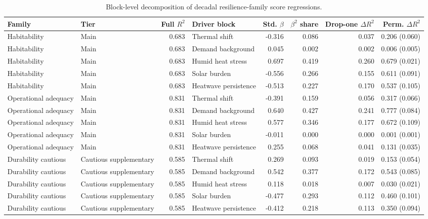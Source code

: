 \begin{table}[t]
\centering
\scriptsize
\caption{Block-level decomposition of decadal resilience-family score regressions.}
\label{tab:family-regression-decomposition}
\begin{threeparttable}
\begin{tabular}{llrlrrrr}
\toprule
Family & Tier & Full $R^2$ & Driver block & Std. $\beta$ & $\beta^2$ share & Drop-one $\Delta R^2$ & Perm. $\Delta R^2$ \\
\midrule
Habitability & Main & 0.683 & Thermal shift & -0.316 & 0.086 & 0.037 & 0.206 (0.060) \\
Habitability & Main & 0.683 & Demand background & 0.045 & 0.002 & 0.002 & 0.006 (0.005) \\
Habitability & Main & 0.683 & Humid heat stress & 0.697 & 0.419 & 0.260 & 0.679 (0.021) \\
Habitability & Main & 0.683 & Solar burden & -0.556 & 0.266 & 0.155 & 0.611 (0.091) \\
Habitability & Main & 0.683 & Heatwave persistence & -0.513 & 0.227 & 0.170 & 0.537 (0.105) \\
\addlinespace
Operational adequacy & Main & 0.831 & Thermal shift & -0.391 & 0.159 & 0.056 & 0.317 (0.066) \\
Operational adequacy & Main & 0.831 & Demand background & 0.640 & 0.427 & 0.241 & 0.777 (0.084) \\
Operational adequacy & Main & 0.831 & Humid heat stress & 0.577 & 0.346 & 0.177 & 0.672 (0.109) \\
Operational adequacy & Main & 0.831 & Solar burden & -0.011 & 0.000 & 0.000 & 0.001 (0.001) \\
Operational adequacy & Main & 0.831 & Heatwave persistence & 0.255 & 0.068 & 0.041 & 0.131 (0.035) \\
\addlinespace
Durability cautious & Cautious supplementary & 0.585 & Thermal shift & 0.269 & 0.093 & 0.019 & 0.153 (0.054) \\
Durability cautious & Cautious supplementary & 0.585 & Demand background & 0.542 & 0.377 & 0.172 & 0.543 (0.085) \\
Durability cautious & Cautious supplementary & 0.585 & Humid heat stress & 0.118 & 0.018 & 0.007 & 0.030 (0.021) \\
Durability cautious & Cautious supplementary & 0.585 & Solar burden & -0.477 & 0.293 & 0.112 & 0.460 (0.101) \\
Durability cautious & Cautious supplementary & 0.585 & Heatwave persistence & -0.412 & 0.218 & 0.113 & 0.350 (0.094) \\

\end{tabular}
\end{threeparttable}
\end{table}
